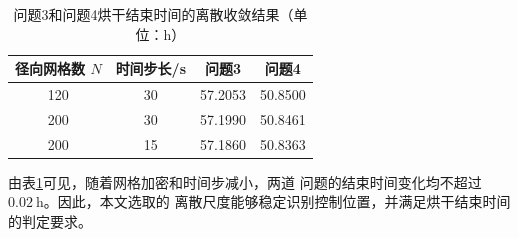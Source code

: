 \documentclass[12pt,a4paper]{article}
\begin{document}
\begin{table}[H]
\centering
\caption{问题3和问题4烘干结束时间的离散收敛结果（单位：h）}
\label{tab:q34-convergence}
\begin{tabular}{cccc}
\toprule
径向网格数 $N$ & 时间步长/s & 问题3 & 问题4\\
\midrule
120 & 30 & 57.2053 & 50.8500\\
200 & 30 & 57.1990 & 50.8461\\
200 & 15 & 57.1860 & 50.8363\\
\bottomrule
\end{tabular}
\end{table}

由表\ref{tab:q34-convergence}可见，随着网格加密和时间步减小，两道
问题的结束时间变化均不超过 $0.02\ \mathrm{h}$。因此，本文选取的
离散尺度能够稳定识别控制位置，并满足烘干结束时间的判定要求。


% 
% 

% 
% 

% 
% 
\end{document}

